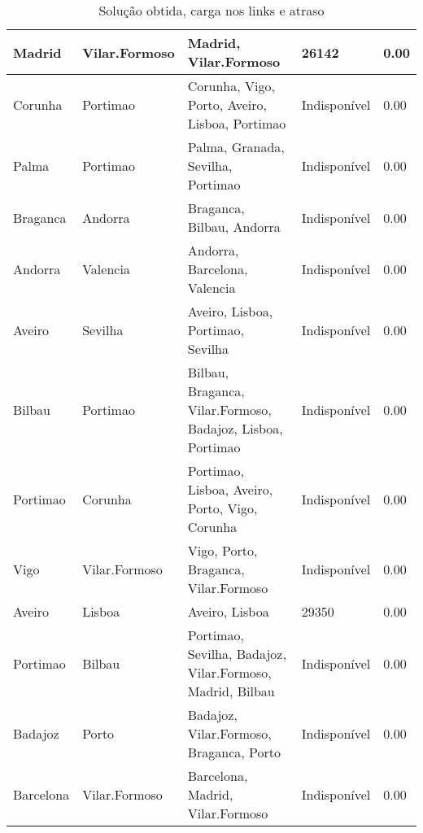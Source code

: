 \begin{table}[!htb]
{\begin{tabular}{|l|l|l|l|l|}
Madrid & Vilar.Formoso & Madrid, Vilar.Formoso & 26142 & 0.00 \\ \hline
Corunha & Portimao & Corunha, Vigo, Porto, Aveiro, Lisboa, Portimao & Indisponível & 0.00 \\ \hline
Palma & Portimao & Palma, Granada, Sevilha, Portimao & Indisponível & 0.00 \\ \hline
Braganca & Andorra & Braganca, Bilbau, Andorra & Indisponível & 0.00 \\ \hline
Andorra & Valencia & Andorra, Barcelona, Valencia & Indisponível & 0.00 \\ \hline
Aveiro & Sevilha & Aveiro, Lisboa, Portimao, Sevilha & Indisponível & 0.00 \\ \hline
Bilbau & Portimao & Bilbau, Braganca, Vilar.Formoso, Badajoz, Lisboa, Portimao & Indisponível & 0.00 \\ \hline
Portimao & Corunha & Portimao, Lisboa, Aveiro, Porto, Vigo, Corunha & Indisponível & 0.00 \\ \hline
Vigo & Vilar.Formoso & Vigo, Porto, Braganca, Vilar.Formoso & Indisponível & 0.00 \\ \hline
Aveiro & Lisboa & Aveiro, Lisboa & 29350 & 0.00 \\ \hline
Portimao & Bilbau & Portimao, Sevilha, Badajoz, Vilar.Formoso, Madrid, Bilbau & Indisponível & 0.00 \\ \hline
Badajoz & Porto & Badajoz, Vilar.Formoso, Braganca, Porto & Indisponível & 0.00 \\ \hline
Barcelona & Vilar.Formoso & Barcelona, Madrid, Vilar.Formoso & Indisponível & 0.00 \\ \hline
\end{tabular}}
\caption[]{Solução obtida, carga nos links e atraso}
\end{table}

